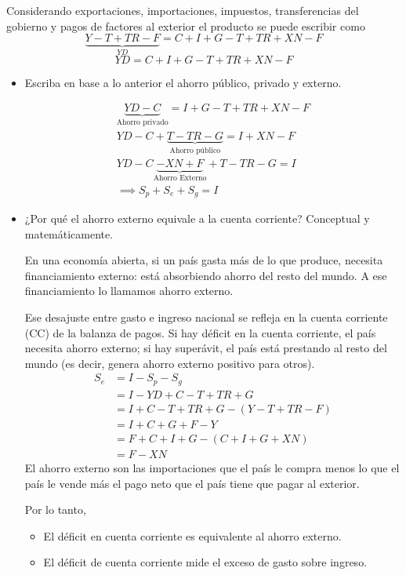 \documentclass[a4paper]{article}
\begin{document}
Considerando exportaciones, importaciones, impuestos, transferencias del gobierno y pagos de factores al exterior el producto se puede escribir como $$\underbrace{Y -T+TR-F }_{YD}= C+I+G-T+TR+XN-F$$ $$YD = C+I+G-T+TR+XN-F$$
 
\begin{itemize}
    \item[d)] Escriba en base a lo anterior el ahorro público, privado y externo.
    \begin{solution}
        \begin{align*}
        \underbrace{YD-C}_\text{Ahorro privado} = I+G-T+TR+XN-F \\
        YD-C + \underbrace{T-TR-G}_{\text{Ahorro público}} = I+XN-F \\
        YD-C \underbrace{-XN+F}_{\text{Ahorro Externo}} +T-TR - G = I \\
        \implies S_p+S_e+S_g = I
        \end{align*}
    \end{solution}
    \item[e)] ¿Por qué el ahorro externo equivale a la cuenta corriente? Conceptual y matemáticamente.
    \begin{solution}
        En una economía abierta, si un país gasta más de lo que produce, necesita financiamiento externo: está absorbiendo ahorro del resto del mundo. A ese financiamiento lo llamamos ahorro externo.
        
        Ese desajuste entre gasto e ingreso nacional se refleja en la cuenta corriente (CC) de la balanza de pagos. Si hay déficit en la cuenta corriente, el país necesita ahorro externo; si hay superávit, el país está prestando al resto del mundo (es decir, genera ahorro externo positivo para otros).
        \begin{align*}
            S_e &= I-S_p-S_g \\
            & = I-YD+C - T+TR+G \\
            & = I+C-T+TR+G - (Y-T+TR-F) \\
            & = I+C+G+F-Y \\
            & = F + C+I+G-(C+I+G+XN) \\
            & = F-XN
        \end{align*}
        El ahorro externo son las importaciones que el país le compra menos lo que el país le vende más el pago neto que el país tiene que pagar al exterior.

        Por lo tanto, 
        \begin{itemize}
            \item El déficit en cuenta corriente es equivalente al ahorro externo. 
            \item El déficit de cuenta corriente mide el exceso de gasto sobre ingreso.
        \end{itemize}
        \end{solution}
        \end{itemize}
\end{document}
